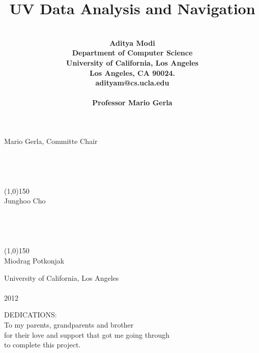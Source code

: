 \documentclass[12pt,fullpage,doublespace]{article}
\begin{document}
\hfill Mario Gerla, Committe Chair\\
\mbox{}\\
\mbox{}\\
\mbox{}\\
\mbox{}\\


\hfill\line(1,0){150}\\

\hfill Junghoo Cho\\
\mbox{}\\
\mbox{}\\
\mbox{}\\
\mbox{}\\


\hfill\line(1,0){150}\\

\hfill Miodrag Potkonjak


\null
\vfill
\begin{center}
University of California, Los Angeles\\
\mbox{}\\
2012
\end{center}
\newpage
\begin{center}
DEDICATIONS:\\
To my parents, grandparents and brother\\
for their love and support that got me going through \\
to complete this project.\\
\end{center}
\newpage

\title{\textbf{UV Data Analysis and Navigation}}
\author{\\\bf {Aditya Modi}\\
Department of Computer Science\\
University of California, Los Angeles \\
Los Angeles, CA 90024. \\
adityam@cs.ucla.edu\\
\mbox{}\\
Professor Mario Gerla}


\date{}
\maketitle
\end{document}
